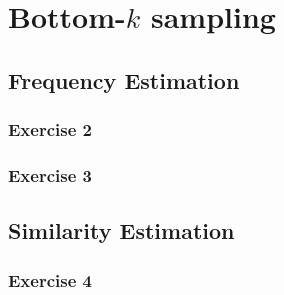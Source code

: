 \section{Bottom-\(k\) sampling}
\subsection{Frequency Estimation}
\subsubsection{Exercise 2}
\subsubsection{Exercise 3}
\subsection{Similarity Estimation}
\subsubsection{Exercise 4}
